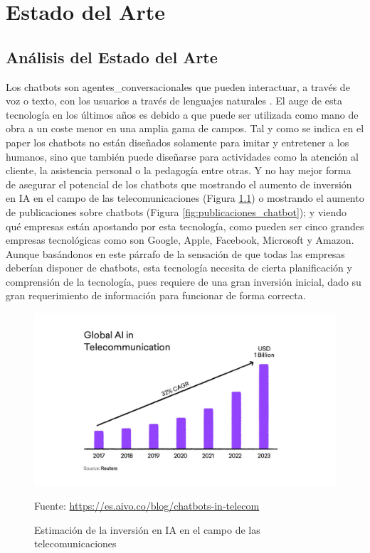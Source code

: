 \chapter{Estado del Arte}

\section{Análisis del Estado del Arte} \label{sec:analisis_estado_arte}

Los chatbots son \gls{agentes_conversacionales} que pueden interactuar, a través de voz o texto, con los usuarios a través de lenguajes naturales \cite{RefWorks:RefID:36-luo2022critical}. El auge de esta tecnología en los últimos años es debido a que puede ser utilizada como mano de obra a un coste menor en una amplia gama de campos. Tal y como se indica en el paper \cite{RefWorks:RefID:37-adamopoulou2020overview} los chatbots no están diseñados solamente para imitar y entretener a los humanos, sino que también puede diseñarse para actividades como la atención al cliente, la asistencia personal o la pedagogía entre otras. Y no hay mejor forma de asegurar el potencial de los chatbots que mostrando el aumento de inversión en \gls{IA} en el campo de las telecomunicaciones (Figura \ref{fig:inversion_chatbot}) o mostrando el aumento de publicaciones sobre chatbots (Figura \ref{fig:publicaciones_chatbot}); y viendo qué empresas están apostando por esta tecnología, como pueden ser cinco grandes empresas tecnológicas como son Google, Apple, Facebook, Microsoft y Amazon. Aunque basándonos en este párrafo de la sensación de que todas las empresas deberían disponer de chatbots, esta tecnología necesita de cierta planificación y comprensión de la tecnología, pues requiere de una gran inversión inicial, dado su gran requerimiento de información para funcionar de forma correcta.

\begin{figure}[h]
\centering
\includegraphics[width=1.0\textwidth]{imagenes/02_EstadoDelArte/inversion_chatbots.jpg}
\begin{center}
Fuente: \url{https://es.aivo.co/blog/chatbots-in-telecom}
\end{center}
\caption{Estimación de la inversión en IA en el campo de las telecomunicaciones}
\label{fig:inversion_chatbot}
\end{figure}

